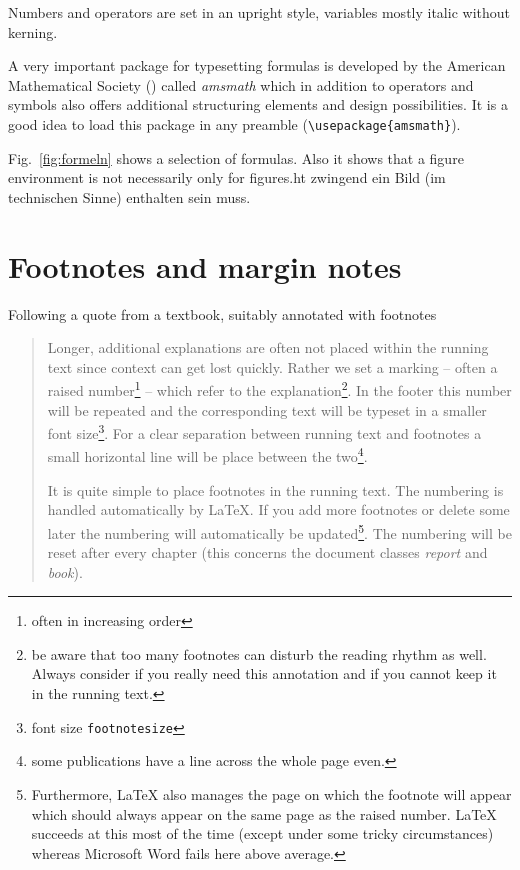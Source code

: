 \documentclass[11pt, a4paper]{article}
\newcommand{\ltx}{\LaTeX}
\let\oldmarginpar\marginpar
\renewcommand{\marginpar}[1]{\oldmarginpar{\textit{#1}}}
\begin{document}
Numbers and operators are set in an upright style, variables mostly italic without kerning.

A very important package for typesetting formulas is developed by the American Mathematical Society (\AmS) called \textit{amsmath} which in addition to operators and symbols also offers additional structuring elements and design possibilities. It is a good idea to load this package in any preamble (\verb+\usepackage{amsmath}+).

Fig.~\ref{fig:formeln} shows a selection of formulas. Also it shows that a figure environment is not necessarily only for figures.ht zwingend ein Bild (im technischen Sinne) enthalten sein muss.

\clearpage %

\section{Footnotes and margin notes}

Following a quote from a textbook, suitably annotated with footnotes\marginpar{Footnotes}

\begin{quote}
Longer, additional explanations are often not placed within the running text since context can get lost quickly. Rather we set a marking -- often a raised number\footnote{often in increasing order} -- which refer to the explanation\footnote{be aware that too many footnotes can disturb the reading rhythm as well. Always consider if you really need this annotation and if you cannot keep it in the running text.}. In the footer this number will be repeated and the corresponding text will be typeset in a smaller font size\footnote{font size \texttt{footnotesize}}. For a clear separation between running text and footnotes a small horizontal line will be place between the two\footnote{some publications have a line across the whole page even.}.

It is quite simple to place footnotes in the running text. The numbering is handled automatically by \ltx{}. If you add more footnotes or delete some later the numbering will automatically be updated\footnote{Furthermore, \ltx{} also manages the page on which the footnote will appear which should always appear on the same page as the raised number. \ltx{} succeeds at this most of the time (except under some tricky circumstances) whereas Microsoft Word fails here above average.}. The numbering will be reset after every chapter (this concerns the document classes \textit{report} and \textit{book}). 

\end{quote}
\end{document}
